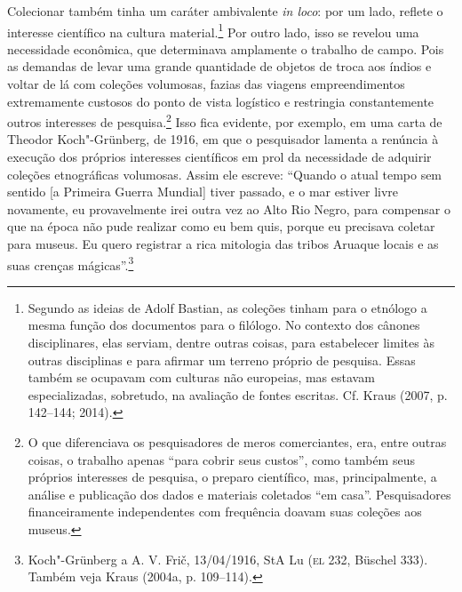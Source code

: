 Colecionar também tinha um caráter ambivalente \emph{in loco}: por um
lado, reflete o interesse científico na cultura material.\footnote{Segundo
  as ideias de Adolf Bastian, as coleções tinham para o etnólogo a mesma
  função dos documentos para o filólogo. No contexto dos cânones
  disciplinares, elas serviam, dentre outras coisas, para estabelecer
  limites às outras disciplinas e para afirmar um terreno próprio de
  pesquisa. Essas também se ocupavam com culturas não europeias, mas
  estavam especializadas, sobretudo, na avaliação de fontes escritas.
  Cf. Kraus (2007, p. 142--144; 2014).} Por outro lado, isso se revelou
uma necessidade econômica, que determinava amplamente o trabalho de
campo. Pois as demandas de levar uma grande quantidade de objetos de
troca aos índios e voltar de lá com coleções volumosas, fazias das
viagens empreendimentos extremamente custosos do ponto de vista
logístico e restringia constantemente outros interesses de
pesquisa.\footnote{O que diferenciava os pesquisadores de meros
  comerciantes, era, entre outras coisas, o trabalho apenas ``para
  cobrir seus custos'', como também seus próprios interesses de
  pesquisa, o preparo científico, mas, principalmente, a análise e
  publicação dos dados e materiais coletados ``em casa''. Pesquisadores
  financeiramente independentes com frequência doavam suas coleções aos
  museus.} Isso fica evidente, por exemplo, em uma carta de Theodor
Koch"-Grünberg, de 1916, em que o pesquisador lamenta a renúncia à
execução dos próprios interesses científicos em prol da necessidade de
adquirir coleções etnográficas volumosas. Assim ele escreve: ``Quando o
atual tempo sem sentido {[}a Primeira Guerra Mundial{]} tiver passado,
e o mar estiver livre novamente, eu provavelmente irei outra vez ao Alto
Rio Negro, para compensar o que na época não pude realizar como eu bem
quis, porque eu precisava coletar para museus. Eu quero registrar a
rica mitologia das tribos Aruaque locais e as suas crenças
mágicas''.\footnote{Koch"-Grünberg a A. V. Frič, 13/04/1916, StA Lu (\textsc{el}
  232, Büschel 333). Também veja Kraus (2004a, p. 109--114).}

